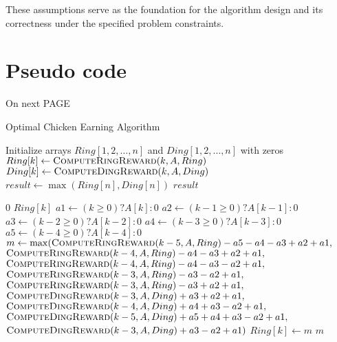 \documentclass{article}
\begin{document}
These assumptions serve as the foundation for the algorithm design and its correctness under the specified problem constraints.


\section{Pseudo code}
\begin{center}
\Huge On next PAGE
\end{center}

\vfill


\begin{algorithm}
\caption{Optimal Chicken Earning Algorithm}
\begin{algorithmic}[1]

    \State Initialize arrays $Ring[1, 2, \ldots, n]$ and $Ding[1, 2, \ldots, n]$ with zeros
        \State $Ring[k] \gets \Call{ComputeRingReward}{k, A, Ring}$
        \State $Ding[k] \gets \Call{ComputeDingReward}{k, A, Ding}$
    \EndFor
    \State $result \gets \max(Ring[n], Ding[n])$
    \State \Return $result$
\EndProcedure

        \State \Return $0$
        \State \Return $Ring[k]$
    \Else
        \State $a1 \gets (k \geq 0) ? A[k] : 0$
        \State $a2 \gets (k - 1 \geq 0) ? A[k - 1] : 0$
        \State $a3 \gets (k - 2 \geq 0) ? A[k - 2] : 0$
        \State $a4 \gets (k - 3 \geq 0) ? A[k - 3] : 0$
        \State $a5 \gets (k - 4 \geq 0) ? A[k - 4] : 0$
        \State $m \gets \max(\Call{ComputeRingReward}{k - 5, A, Ring} - a5 - a4 - a3 + a2 + a1,$
        \State \hspace{1.5em} $\Call{ComputeRingReward}{k - 4, A, Ring} - a4 - a3 + a2 + a1,$
        \State \hspace{1.5em} $\Call{ComputeRingReward}{k - 4, A, Ring} - a4 - a3 - a2 + a1,$
        \State \hspace{1.5em} $\Call{ComputeRingReward}{k - 3, A, Ring} - a3 - a2 + a1,$
        \State \hspace{1.5em} $\Call{ComputeRingReward}{k - 3, A, Ring} - a3 + a2 + a1,$
        \State \hspace{1.5em} $\Call{ComputeDingReward}{k - 3, A, Ding} + a3 + a2 + a1,$
        \State \hspace{1.5em} $\Call{ComputeDingReward}{k - 4, A, Ding} + a4 + a3 - a2 + a1,$
        \State \hspace{1.5em} $\Call{ComputeDingReward}{k - 5, A, Ding} + a5 + a4 + a3 - a2 + a1,$
        \State \hspace{1.5em} $\Call{ComputeDingReward}{k - 3, A, Ding} + a3 - a2 + a1)$
        \State $Ring[k] \gets m$
        \State \Return $m$
    \EndIf
\EndProcedure


\end{algorithmic}
\end{algorithm}
\end{document}
